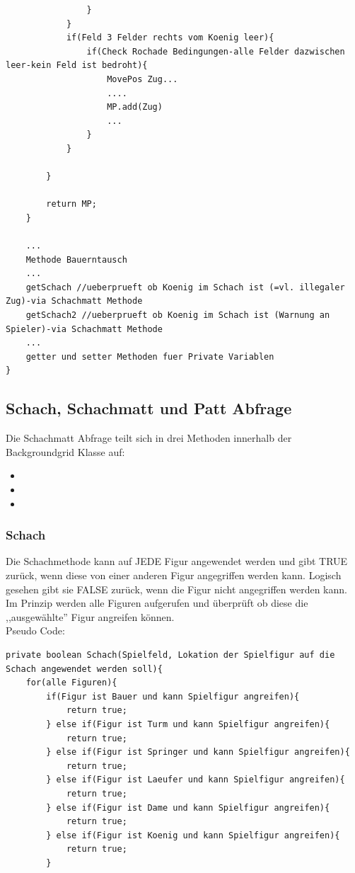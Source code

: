 \documentclass[12pt,a4paper]{article}
\begin{document}
{\begin{lstlisting}
				}
			}
			if(Feld 3 Felder rechts vom Koenig leer){
				if(Check Rochade Bedingungen-alle Felder dazwischen leer-kein Feld ist bedroht){
					MovePos Zug...
					....
					MP.add(Zug)
					...
				}
			}
		
		}
		
		return MP;
	}
	
	...
	Methode Bauerntausch
	...
	getSchach //ueberprueft ob Koenig im Schach ist (=vl. illegaler Zug)-via Schachmatt Methode
	getSchach2 //ueberprueft ob Koenig im Schach ist (Warnung an Spieler)-via Schachmatt Methode
	...
	getter und setter Methoden fuer Private Variablen
}
\end{lstlisting}

\subsection{Schach, Schachmatt und Patt Abfrage}
\label{SUBSEC:checkmate}

Die Schachmatt Abfrage teilt sich in drei Methoden innerhalb der Backgroundgrid Klasse auf:
\begin{itemize}
	\item{}
	\item{}
	\item{}
\end{itemize}



\subsubsection{Schach}
\label{SUBSUBSEC:check}

Die Schachmethode kann auf JEDE Figur angewendet werden und gibt TRUE zurück, wenn diese von einer anderen Figur angegriffen werden kann. Logisch gesehen gibt sie FALSE zurück, wenn die Figur nicht angegriffen werden kann. \\
Im Prinzip werden alle Figuren aufgerufen und überprüft ob diese die ,,ausgewählte'' Figur angreifen können. \\
Pseudo Code:

\lstset{language=Java}
\begin{lstlisting}
private boolean Schach(Spielfeld, Lokation der Spielfigur auf die Schach angewendet werden soll){
	for(alle Figuren){
		if(Figur ist Bauer und kann Spielfigur angreifen){
			return true;		
		} else if(Figur ist Turm und kann Spielfigur angreifen){
			return true;
		} else if(Figur ist Springer und kann Spielfigur angreifen){
			return true;
		} else if(Figur ist Laeufer und kann Spielfigur angreifen){
			return true;
		} else if(Figur ist Dame und kann Spielfigur angreifen){
			return true;
		} else if(Figur ist Koenig und kann Spielfigur angreifen){
			return true;
		}
		

\end{lstlisting}}
\end{document}
